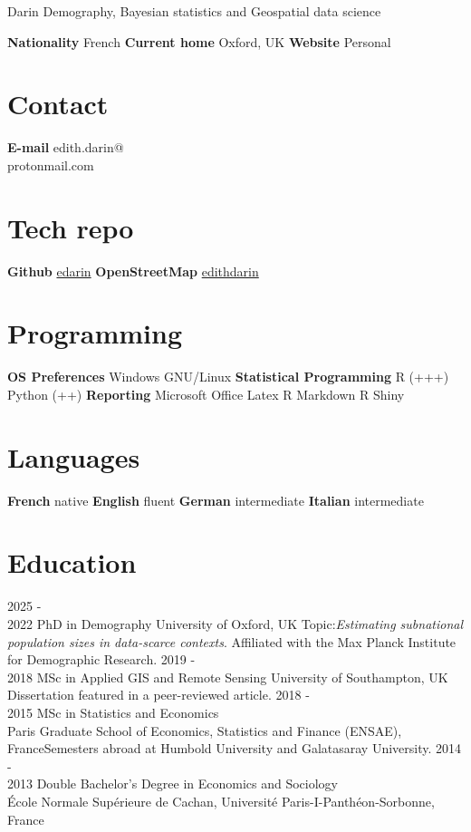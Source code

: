 \documentclass[
]{friggeri-cv}
\author{}
\date{\vspace{-2.5em}}
\begin{document}
 { Darin}
{\qquad \qquad  \qquad  \qquad Demography, Bayesian statistics and Geospatial data science}


\begin{aside}
\textbf{Nationality}
French
\textbf{Current home}
Oxford, UK
\textbf{Website}
Personal \href{https://edarin.github.io/thatsme/}{\scriptsize{}}
~
\section{Contact}
\textbf{E-mail}
edith.darin@\\protonmail.com
~
\section{Tech repo}
\textbf{Github}
\href{https://github.com/edarin}{edarin}
\textbf{OpenStreetMap}
\href{https://www.openstreetmap.org/user/edithdarin/history#map=5/22.938/11.470}{edithdarin}
~
\section{Programming}
\textbf{OS Preferences}
Windows
GNU/Linux
\textbf{Statistical Programming}
R (+++)
Python (++)
\textbf{Reporting}
Microsoft Office
Latex
R Markdown
R Shiny
~
\section{Languages}
\textbf{French} native
\textbf{English} fluent
\textbf{German} intermediate
\textbf{Italian} intermediate
~
\end{aside}
\section{Education}
\begin{entrylist}
\entry
{2025 - \\ 2022}
{PhD in Demography}
{University of Oxford, UK}
{Topic:\textit{Estimating subnational population sizes in data-scarce contexts}. Affiliated with the Max Planck Institute for Demographic Research.}
\entry
{2019 - \\ 2018}
{MSc in Applied GIS and Remote Sensing}
{University of Southampton, UK}
{Dissertation featured in a peer-reviewed article.}
\entry
{2018 - \\ 2015}
{MSc in Statistics and Economics}
{\\Paris Graduate School of Economics, Statistics and Finance (ENSAE), France}{Semesters abroad at Humbold University and Galatasaray University.}
\entry
{2014 - \\ 2013}
{Double Bachelor's Degree in Economics and Sociology}
{\\École Normale Supérieure de Cachan, Université Paris-I-Panthéon-Sorbonne, France}
{}
\end{entrylist}
\end{document}
